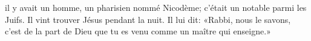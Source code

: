 \encetemps il y avait un homme, un pharisien nommé Nicodème;
	c’était un notable parmi les Juifs.
Il vint trouver Jésus pendant la nuit. Il lui dit:
«Rabbi, nous le savons, c’est de la part de Dieu que tu es venu
	comme un maître qui enseigne.»
